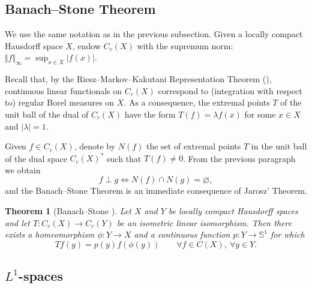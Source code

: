 \documentclass[letter,11pt]{amsart}
\theoremstyle{plain}		\newtheorem{theorem}[generalnumbering]{Theorem}
\theoremstyle{plain}		\newtheorem{corollary}[generalnumbering]{Corollary}
\theoremstyle{definition}		\newtheorem{definition}[generalnumbering]{Definition}
\theoremstyle{definition}		\newtheorem{example}[generalnumbering]{Example}
\theoremstyle{plain}		\newtheorem{proposition}[generalnumbering]{Proposition}
\theoremstyle{plain}		\newtheorem{lemma}[generalnumbering]{Lemma}
\theoremstyle{definition}
\begin{document}

\subsection{Banach--Stone Theorem}\label{subsectionbanachstone}

We use the same notation as in the previous subsection. Given a locally compact Hausdorff space $X$, endow $C_c(X)$ with the supremum norm: $\Vert f\Vert_\infty=\sup_{x\in X}|f(x)|$.

Recall that, by the Riesz--Markov--Kakutani Representation Theorem (\cite[Theorem 2.14]{MR584266}), continuous linear functionals on $C_c(X)$ correspond to (integration with respect to) regular Borel measures on $X$. As a consequence, the extremal points $T$ of the unit ball of the dual of $C_c(X)$ have the form $T(f)=\lambda f(x)$ for some $x\in X$ and $|\lambda|=1$.

Given $f\in C_c(X)$, denote by $N(f)$ the set of extremal points $T$ in the unit ball of the dual space $C_c(X)^*$ such that $T(f)\neq 0$. From the previous paragraph we obtain
\[f\perp g\iff N(f)\cap N(g)=\varnothing\tag{BS},\]
and the Banach--Stone Theorem is an immediate consequence of Jarosz' Theorem.

\begin{theorem}[Banach--Stone \cite{MR1501905}]\label{theorembanachstone}
	Let $X$ and $Y$ be locally compact Hausdorff spaces and let $T\colon C_c(X)\to C_c(Y)$ be an isometric linear isomorphism. Then there exists a homeomorphism $\phi\colon Y\to X$ and a continuous function $p\colon Y\to\mathbb{S}^1$ for which
	\[Tf(y)=p(y)f(\phi(y))\qquad\forall f\in C(X),\ \forall y\in Y.\]
\end{theorem}


\subsection{\texorpdfstring{$L^1$}{L¹}-spaces}\label{subsectionl1spaces}
\end{document}
